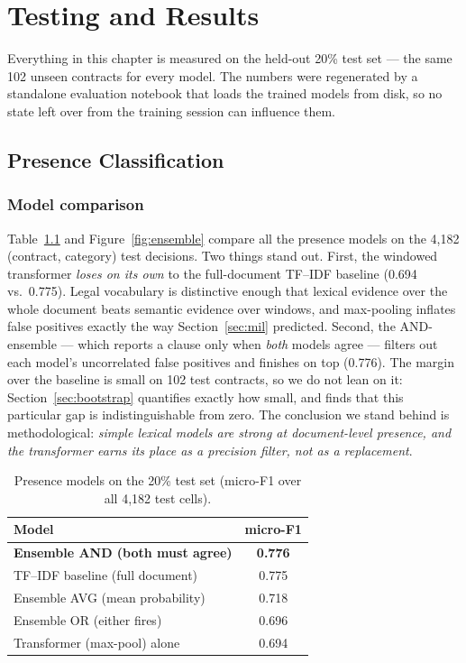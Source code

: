 \chapter{Testing and Results}

Everything in this chapter is measured on the held-out 20\% test set --- the same 102 unseen contracts for every model. The numbers were regenerated by a standalone evaluation notebook that loads the trained models from disk, so no state left over from the training session can influence them.

\section{Presence Classification}

\subsection{Model comparison}
Table~\ref{tab:ensemble} and Figure~\ref{fig:ensemble} compare all the presence models on the 4{,}182 (contract, category) test decisions. Two things stand out. First, the windowed transformer \emph{loses on its own} to the full-document TF--IDF baseline (0.694 vs.\ 0.775). Legal vocabulary is distinctive enough that lexical evidence over the whole document beats semantic evidence over windows, and max-pooling inflates false positives exactly the way Section~\ref{sec:mil} predicted. Second, the AND-ensemble --- which reports a clause only when \emph{both} models agree --- filters out each model's uncorrelated false positives and finishes on top (0.776). The margin over the baseline is small on 102 test contracts, so we do not lean on it: Section~\ref{sec:bootstrap} quantifies exactly how small, and finds that this particular gap is indistinguishable from zero. The conclusion we stand behind is methodological: \emph{simple lexical models are strong at document-level presence, and the transformer earns its place as a precision filter, not as a replacement}.

\begin{table}[ht]
\centering
\caption{Presence models on the 20\% test set (micro-F1 over all 4{,}182 test cells).}
\label{tab:ensemble}
\begin{tabular}{lc}
\toprule
\textbf{Model} & \textbf{micro-F1}\\
\midrule
\textbf{Ensemble AND (both must agree)} & \textbf{0.776}\\
TF--IDF baseline (full document)        & 0.775\\
Ensemble AVG (mean probability)         & 0.718\\
Ensemble OR (either fires)              & 0.696\\
Transformer (max-pool) alone            & 0.694\\
\bottomrule
\end{tabular}
\end{table}

